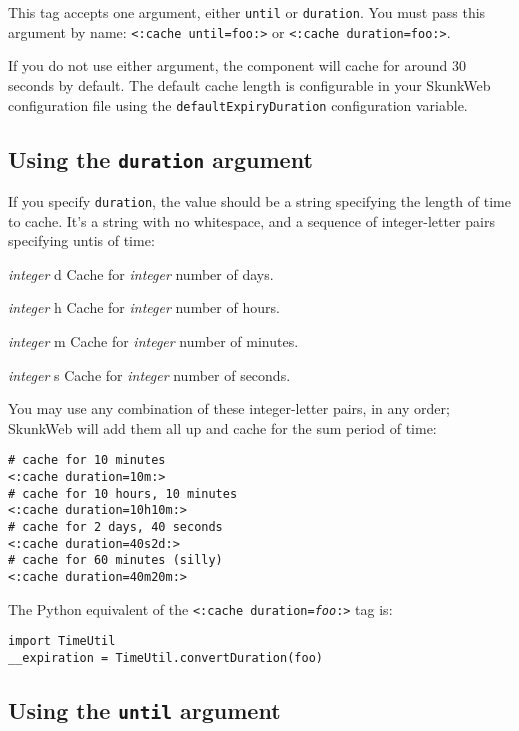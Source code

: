 \documentclass{manual}
\begin{document}
This tag accepts one argument, either \texttt{until}
or \texttt{duration}. You must pass this argument by name:
\texttt{<:cache until=foo:>} or
\texttt{<:cache duration=foo:>}.

If you do not use either argument, the component will cache for around
30 seconds by default. The default cache length is configurable in
your SkunkWeb configuration file using the
\texttt{defaultExpiryDuration} configuration variable.

\subsection{Using the \texttt{duration} argument}

If you specify \texttt{duration}, the value should be 
a string specifying the length of time to cache. It's a 
string with no whitespace, and a sequence of integer-letter
pairs specifying untis of time:

\begin{argdesc}

\item[\emph{integer} d]
Cache for \emph{integer} number of days.
\item[\emph{integer} h]
Cache for \emph{integer} number of hours.
\item[\emph{integer} m]
Cache for \emph{integer} number of minutes.
\item[\emph{integer} s]
Cache for \emph{integer} number of seconds.
\end{argdesc}

You may use any combination of these integer-letter pairs,
in any order; SkunkWeb will add them all up and cache for the sum
period of time:

\begin{verbatim}
# cache for 10 minutes
<:cache duration=10m:>
# cache for 10 hours, 10 minutes
<:cache duration=10h10m:>
# cache for 2 days, 40 seconds
<:cache duration=40s2d:>
# cache for 60 minutes (silly)
<:cache duration=40m20m:>
\end{verbatim}

The Python equivalent of the \texttt{<:cache duration=\emph{foo}:>} tag is:
\begin{verbatim}
import TimeUtil
__expiration = TimeUtil.convertDuration(foo)
\end{verbatim}

\subsection{Using the \texttt{until} argument}
\end{document}
